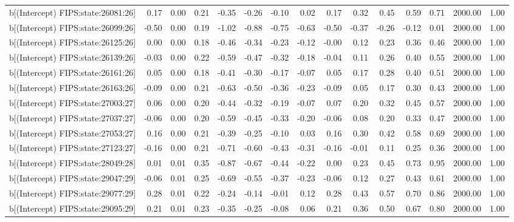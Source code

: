 \begin{table}[ht]
\begin{tabular}{rrrrrrrrrrrrrrr}
  b[(Intercept) FIPS:state:26081:26] & 0.17 & 0.00 & 0.21 & -0.35 & -0.26 & -0.10 & 0.02 & 0.17 & 0.32 & 0.45 & 0.59 & 0.71 & 2000.00 & 1.00 \\ 
  b[(Intercept) FIPS:state:26099:26] & -0.50 & 0.00 & 0.19 & -1.02 & -0.88 & -0.75 & -0.63 & -0.50 & -0.37 & -0.26 & -0.12 & 0.01 & 2000.00 & 1.00 \\ 
  b[(Intercept) FIPS:state:26125:26] & 0.00 & 0.00 & 0.18 & -0.46 & -0.34 & -0.23 & -0.12 & -0.00 & 0.12 & 0.23 & 0.36 & 0.46 & 2000.00 & 1.00 \\ 
  b[(Intercept) FIPS:state:26139:26] & -0.03 & 0.00 & 0.22 & -0.59 & -0.47 & -0.32 & -0.18 & -0.04 & 0.11 & 0.26 & 0.40 & 0.55 & 2000.00 & 1.00 \\ 
  b[(Intercept) FIPS:state:26161:26] & 0.05 & 0.00 & 0.18 & -0.41 & -0.30 & -0.17 & -0.07 & 0.05 & 0.17 & 0.28 & 0.40 & 0.51 & 2000.00 & 1.00 \\ 
  b[(Intercept) FIPS:state:26163:26] & -0.09 & 0.00 & 0.21 & -0.63 & -0.50 & -0.36 & -0.23 & -0.09 & 0.05 & 0.17 & 0.30 & 0.43 & 2000.00 & 1.00 \\ 
  b[(Intercept) FIPS:state:27003:27] & 0.06 & 0.00 & 0.20 & -0.44 & -0.32 & -0.19 & -0.07 & 0.07 & 0.20 & 0.32 & 0.45 & 0.57 & 2000.00 & 1.00 \\ 
  b[(Intercept) FIPS:state:27037:27] & -0.06 & 0.00 & 0.20 & -0.59 & -0.45 & -0.33 & -0.20 & -0.06 & 0.08 & 0.20 & 0.33 & 0.47 & 2000.00 & 1.00 \\ 
  b[(Intercept) FIPS:state:27053:27] & 0.16 & 0.00 & 0.21 & -0.39 & -0.25 & -0.10 & 0.03 & 0.16 & 0.30 & 0.42 & 0.58 & 0.69 & 2000.00 & 1.00 \\ 
  b[(Intercept) FIPS:state:27123:27] & -0.16 & 0.00 & 0.21 & -0.71 & -0.60 & -0.43 & -0.31 & -0.16 & -0.01 & 0.11 & 0.25 & 0.36 & 2000.00 & 1.00 \\ 
  b[(Intercept) FIPS:state:28049:28] & 0.01 & 0.01 & 0.35 & -0.87 & -0.67 & -0.44 & -0.22 & 0.00 & 0.23 & 0.45 & 0.73 & 0.95 & 2000.00 & 1.00 \\ 
  b[(Intercept) FIPS:state:29047:29] & -0.06 & 0.01 & 0.25 & -0.69 & -0.55 & -0.37 & -0.23 & -0.06 & 0.12 & 0.27 & 0.43 & 0.61 & 2000.00 & 1.00 \\ 
  b[(Intercept) FIPS:state:29077:29] & 0.28 & 0.01 & 0.22 & -0.24 & -0.14 & -0.01 & 0.12 & 0.28 & 0.43 & 0.57 & 0.70 & 0.86 & 2000.00 & 1.00 \\ 
  b[(Intercept) FIPS:state:29095:29] & 0.21 & 0.01 & 0.23 & -0.35 & -0.25 & -0.08 & 0.06 & 0.21 & 0.36 & 0.50 & 0.67 & 0.80 & 2000.00 & 1.00 \\ 

\end{tabular}
\end{table}
